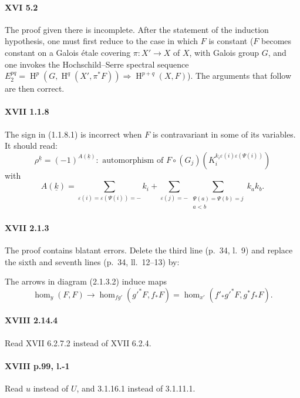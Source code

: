 \documentclass[oneside]{book}
\DeclareMathOperator{\h}{H}
\theoremstyle{sga-source}
\theoremstyle{sga-source-dash}
\theoremstyle{sga-source-dotdash}
\theoremstyle{sga-source-number-note-dash}
\theoremstyle{sga-source-note-number-dotdash}
\theoremstyle{sga-source-example-dotdash}
\theoremstyle{sga-source-inline-number}
\theoremstyle{sga-source-bare-number}
\theoremstyle{sga-source}
\begin{document}
\paragraph{XVI 5.2}
The proof given there is incomplete. After the statement of the induction
hypothesis, one must first reduce to the case in which $F$ is constant
($F$ becomes constant on a Galois \'etale covering $\pi:X'\to X$ of $X$,
with Galois group $G$, and one invokes the Hochschild--Serre spectral sequence
$E_2^{p q}=\h^p(G,\h^q(X',\pi^\ast F))\Rightarrow \h^{p+q}(X,F)$).
The arguments that follow are then correct.

\paragraph{XVII 1.1.8}
The sign in (1.1.8.1) is incorrect when $F$ is contravariant in some of its
variables. It should read:
\begin{equation*}\tag{1.1.8.1}
  \rho^{\underline k} = (-1)^{A(\underline k)}: \text{ automorphism of }
F\circ (G_j)\left(K_i^{k_i\varepsilon(i)\varepsilon(\Psi(i))}\right)
\end{equation*}
with
\[
  A(\underline k) = \sum_{\varepsilon(i) = \varepsilon(\Psi(i))=-} k_i + \sum_{\varepsilon(j)=-} \sum_{\substack{\Psi(a)=\Psi(b)=j \\ a<b}} k_a k_b .
\]

\paragraph{XVII 2.1.3}
The proof contains blatant errors. Delete the third line (p.~34, l.~9) and
replace the sixth and seventh lines (p.~34, ll.~12--13) by:

The arrows in diagram (2.1.3.2) induce maps
\[
  \hom_y(F,F) \to \hom_{f g'}({g'}^\ast F,f_\ast F) = \hom_{x'}(f'_\ast {g'}^\ast F,g^\ast f_\ast F) \text{.}
\]

\paragraph{XVIII 2.14.4}
Read XVII 6.2.7.2 instead of XVII 6.2.4.

\paragraph{XVIII p.99, l.-1}
Read $u$ instead of $U$, and 3.1.16.1 instead of 3.1.11.1.


\end{document}
